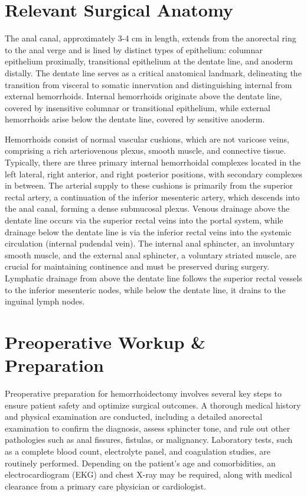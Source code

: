 \section*{Relevant Surgical Anatomy}
The anal canal, approximately 3-4 cm in length, extends from the anorectal ring to the anal verge and is lined by distinct types of epithelium: columnar epithelium proximally, transitional epithelium at the dentate line, and anoderm distally. The dentate line serves as a critical anatomical landmark, delineating the transition from visceral to somatic innervation and distinguishing internal from external hemorrhoids. Internal hemorrhoids originate above the dentate line, covered by insensitive columnar or transitional epithelium, while external hemorrhoids arise below the dentate line, covered by sensitive anoderm.

Hemorrhoids consist of normal vascular cushions, which are not varicose veins, comprising a rich arteriovenous plexus, smooth muscle, and connective tissue. Typically, there are three primary internal hemorrhoidal complexes located in the left lateral, right anterior, and right posterior positions, with secondary complexes in between. The arterial supply to these cushions is primarily from the superior rectal artery, a continuation of the inferior mesenteric artery, which descends into the anal canal, forming a dense submucosal plexus. Venous drainage above the dentate line occurs via the superior rectal veins into the portal system, while drainage below the dentate line is via the inferior rectal veins into the systemic circulation (internal pudendal vein). The internal anal sphincter, an involuntary smooth muscle, and the external anal sphincter, a voluntary striated muscle, are crucial for maintaining continence and must be preserved during surgery. Lymphatic drainage from above the dentate line follows the superior rectal vessels to the inferior mesenteric nodes, while below the dentate line, it drains to the inguinal lymph nodes.

\section*{Preoperative Workup \& Preparation}
Preoperative preparation for hemorrhoidectomy involves several key steps to ensure patient safety and optimize surgical outcomes. A thorough medical history and physical examination are conducted, including a detailed anorectal examination to confirm the diagnosis, assess sphincter tone, and rule out other pathologies such as anal fissures, fistulas, or malignancy. Laboratory tests, such as a complete blood count, electrolyte panel, and coagulation studies, are routinely performed. Depending on the patient's age and comorbidities, an electrocardiogram (EKG) and chest X-ray may be required, along with medical clearance from a primary care physician or cardiologist.


